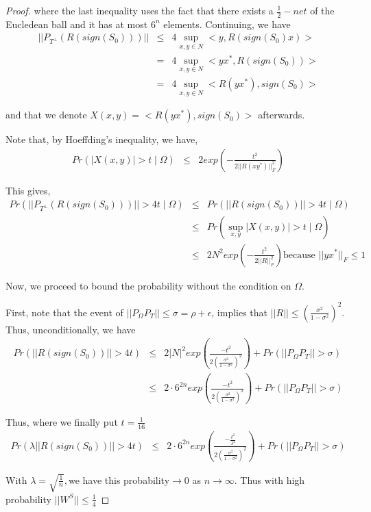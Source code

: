 \begin{proof}
where the last inequality uses the fact that there exists a $\frac{1}{2}-net$ of the Eucledean ball and it has at most $6^{n}$ elements. Continuing, we have 
\begin{eqnarray*}
||P_{T^{\bot}}(R(sign(S_{0})))|| & \le & 4\sup_{x,y\in N}<y,R(sign(S_{0})x)>\\
 & = & 4\sup_{x,y\in N}<yx^{*},R(sign(S_{0}))>\\
 & = & 4\sup_{x,y\in N}<R(yx^{*}),sign(S_{0})>
\end{eqnarray*}


and that we denote $X(x,y)=<R(yx^{*}),sign(S_{0})>$ afterwards.

Note that, by Hoeffding's inequality, we have, 
\begin{eqnarray*}
Pr(|X(x,y)|>t\mid\Omega) & \le & 2exp(-\frac{t^{2}}{2||R(xy^{*})||_{F}^{2}})
\end{eqnarray*}


This gives, 
\begin{eqnarray*}
Pr(||P_{T^{\bot}}(R(sign(S_{0})))||>4t\mid\Omega) & \le & Pr(||R(sign(S_{0}))||>4t\mid\Omega)\\
 & \le & Pr(\sup_{x,y}|X(x,y)|>t\mid\Omega)\\
 & \le & 2N^{2}exp(-\frac{t^{2}}{2||R||_{F}^{2}})\text{because }||yx^{*}||_{F}\le1
\end{eqnarray*}


Now, we proceed to bound the probability without the condition on $\Omega$. 

First, note that the event of $||P_{\Omega}P_{T}||\le\sigma=\rho+\epsilon$, implies that $||R||\le(\frac{\sigma^{2}}{1-\sigma^{2}})^{2}$. Thus, unconditionally, we have 
\begin{eqnarray*}
Pr(||R(sign(S_{0}))||>4t) & \le & 2|N|^{2}exp(\frac{-t^{2}}{2(\frac{\sigma^{2}}{1-\sigma^{2}})^{2}})+Pr(||P_{\Omega}P_{T}||>\sigma)\\
 & \le & 2\cdot6^{2n}exp(\frac{-t^{2}}{2(\frac{\sigma^{2}}{1-\sigma^{2}})^{2}})+Pr(||P_{\Omega}P_{T}||>\sigma)
\end{eqnarray*}


Thus, where we finally put $t=\frac{1}{16}$ 
\begin{eqnarray*}
Pr(\lambda||R(sign(S_{0}))||>4t) & \le & 2\cdot6^{2n}exp(\frac{-\frac{t^{2}}{\lambda^{2}}}{2(\frac{\sigma^{2}}{1-\sigma^{2}})^{2}})+Pr(||P_{\Omega}P_{T}||>\sigma)
\end{eqnarray*}


With $\lambda=\sqrt{\frac{1}{n}},$we have this probability$\to0$ as $n\to\infty$. Thus with high probability $||W^{S}||\le\frac{1}{4}$


\end{proof}
